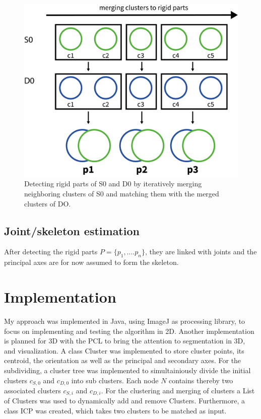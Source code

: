 \documentclass[a4paper,english,11pt]{report}
\begin{document}
\begin{figure}
	\centering
	\includegraphics[width=0.7\linewidth]{ClusterChain}
	\caption{Detecting rigid parts of S0 and D0 by iteratively merging neighboring clusters of S0 and matching them with the merged clusters of DO.}
	\label{fig:clusterChain}
\end{figure}

\subsection{Joint/skeleton estimation}

After detecting the rigid parts $ P =  \{ {p_1,....p_n}\}$, they are linked with joints and the principal axes are for now assumed to form the skeleton. 

\section{Implementation}

My approach was implemented in Java, using ImageJ as processing library, to focus on implementing and testing the algorithm in 2D. Another implementation is planned for 3D with the PCL to bring the attention to segmentation in 3D, and visualization. A class Cluster was implemented to store cluster points, its centroid, the orientation as well as the principal and secondary axes. For the subdividing, a cluster tree was implemented to simultainiously divide the initial clusters $c_{S, 0}$ and $c_{D, 0}$ into sub clusters. Each node $N$ contains thereby two associated clusters $c_{S, i}$ and $c_{D, i}$. For the clustering and merging of clusters a List of Clusters was used to dynamically add and remove Clusters. Furthermore, a class ICP was created, which takes two clusters to be matched as input.
\end{document}
